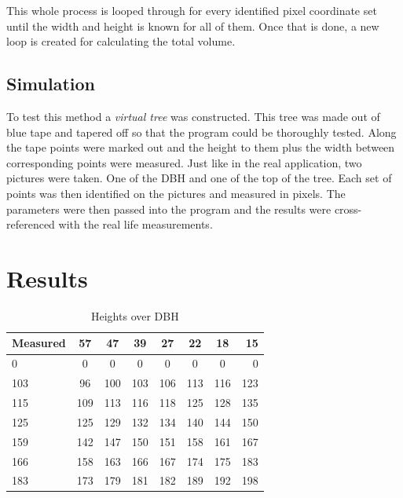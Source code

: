 This whole process is looped through for every identified pixel coordinate set 
until the width and height is known for all of them. Once that is done, a new
loop is created for calculating the total volume.

\subsection{Simulation}
To test this method a \emph{virtual tree} was constructed. This tree was made 
out of blue tape and tapered off so that the program could be thoroughly tested. 
Along the tape points were marked out and the height to them plus the width
between corresponding points were measured. Just like in the real application, 
two pictures were taken. One of the DBH and one of the top of the tree. Each 
set of points was then identified on the pictures and measured in pixels. The 
parameters were then passed into the program and the results were cross-referenced
with the real life measurements.

\newpage

\section{Results}
\begin{table}[h!]
	\begin{center}
		\begin{tabular}{| l c c c c c c r |}		
		\hline
		Measured & 57\degree & 47\degree & 39\degree & 27\degree & 22\degree & 18\degree & 15\degree \\
		\hline
		0 		& 0 	& 0 	& 0 	& 0 	& 0 	& 0 	& 0 	\\
		103 	& 96 	& 100 	& 103 	& 106 	& 113 	& 116 	& 123 	\\
		115 	& 109 	& 113 	& 116 	& 118 	& 125 	& 128 	& 135 	\\
		125 	& 125 	& 129	& 132 	& 134 	& 140 	& 144 	& 150 	\\
		159 	& 142 	& 147 	& 150 	& 151 	& 158 	& 161 	& 167 	\\
		166 	& 158 	& 163 	& 166 	& 167 	& 174 	& 175 	& 183 	\\
		183 	& 173 	& 179 	& 181	& 182 	& 189 	& 192 	& 198 	\\
		\hline
		\end{tabular}
		\caption{Heights over DBH}
		\label{heights}
	\end{center}
\end{table}

